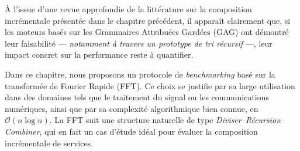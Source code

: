 \label{chap:contribution}


À l'issue d’une revue approfondie de la littérature sur la composition incrémentale présentée dans le chapitre précédent, il apparaît clairement que, si les moteurs basés sur les Grammaires Attribuées Gardées (GAG) ont démontré leur faisabilité — \textit{notamment à travers un prototype de tri récursif} \cite{tagueu2024service} —, leur impact concret sur la performance reste à quantifier. %

Dans ce chapitre, nous proposons un protocole de \textit{benchmarking} basé sur la transformée de Fourier Rapide (FFT). Ce choix se justifie par sa large utilisation dans des domaines tels que le traitement du signal ou les communications numériques, ainsi que par sa complexité algorithmique bien connue, en $\mathcal{O}(n \log n)$. La FFT suit une structure naturelle de type \textit{Diviser–Récursion–Combiner}, qui en fait un cas d’étude idéal pour évaluer la composition incrémentale de services.

